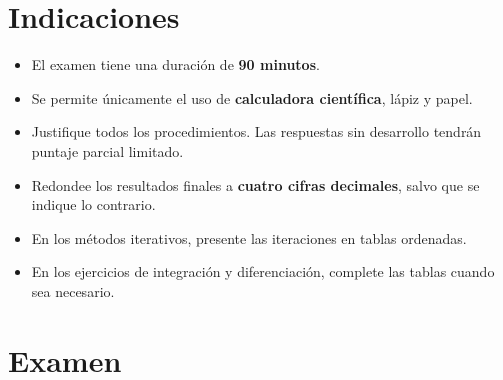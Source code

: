 \documentclass[11pt,respuestas,a4]{aleph-examen}
\begin{document}
\encabezado

\section*{Indicaciones}
\begin{itemize}
    \item El examen tiene una duración de \textbf{90 minutos}.
    \item Se permite únicamente el uso de \textbf{calculadora científica}, lápiz y papel.
    \item Justifique todos los procedimientos. Las respuestas sin desarrollo tendrán puntaje parcial limitado.
    \item Redondee los resultados finales a \textbf{cuatro cifras decimales}, salvo que se indique lo contrario.
    \item En los métodos iterativos, presente las iteraciones en tablas ordenadas.
    \item En los ejercicios de integración y diferenciación, complete las tablas cuando sea necesario.
\end{itemize}

\section*{Examen}
\end{document}
